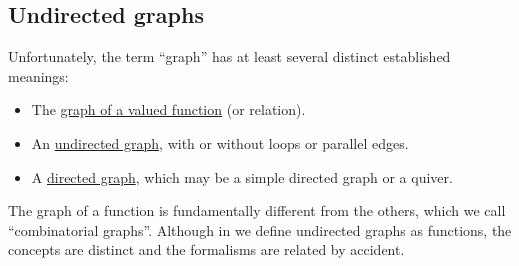 \subsection{Undirected graphs}\label{subsec:undirected_graphs}

\begin{remark}\label{rem:graph_etymology}
  Unfortunately, the term \enquote{graph} has at least several distinct established meanings:
  \begin{itemize}
    \item The \hyperref[def:multi_valued_function/graph]{graph of a valued function} (or relation).
    \item An \hyperref[def:undirected_multigraph]{undirected graph}, with or without loops or parallel edges.
    \item A \hyperref[def:quiver]{directed graph}, which may be a simple directed graph or a quiver.
  \end{itemize}

  The graph of a function is fundamentally different from the others, which we call \enquote{combinatorial graphs}. Although in  we define undirected graphs as functions, the concepts are distinct and the formalisms are related by accident.
\end{remark}

